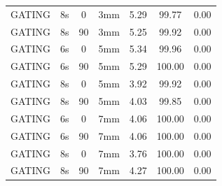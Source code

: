 \documentclass[type=dr, dr=rernat, accentcolor=tud7b,colorbacktitle, bigchapter, openright, twoside, 12pt ]{tudthesis}
\begin{document}
\begin{table}[H]
\begin{tabular}{|c||c|c|c||c|c|c|}
GATING & 8s & 0 & 3mm & 5.29 & 99.77 & 0.00 \\
GATING & 8s & 90 & 3mm & 5.25 & 99.92 & 0.00 \\
GATING & 6s & 0 & 5mm & 5.34 & 99.96 & 0.00 \\
GATING & 6s & 90 & 5mm & 5.29 & 100.00 & 0.00 \\
GATING & 8s & 0 & 5mm & 3.92 & 99.92 & 0.00 \\
GATING & 8s & 90 & 5mm & 4.03 & 99.85 & 0.00 \\
GATING & 6s & 0 & 7mm & 4.06 & 100.00 & 0.00 \\
GATING & 6s & 90 & 7mm & 4.06 & 100.00 & 0.00 \\
GATING & 8s & 0 & 7mm & 3.76 & 100.00 & 0.00 \\
GATING & 8s & 90 & 7mm & 4.27 & 100.00 & 0.00 \\
    \hline\hline 
  \end{tabular}
\end{table}


\newpage
\end{document}
